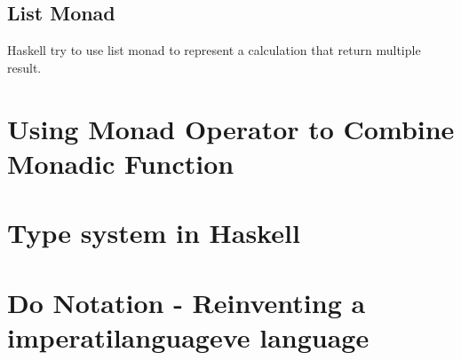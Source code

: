 \subsection{List Monad}
Haskell try to use list monad to represent a calculation that return multiple result.


\section{Using Monad Operator to Combine Monadic Function}

\section{Type system in Haskell}
\section{Do Notation - Reinventing a imperatilanguageve language}

